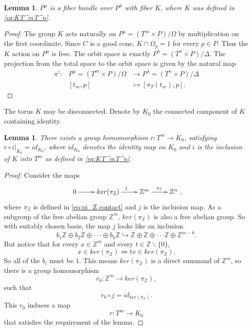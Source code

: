 \documentclass[12pt]{amsart}
\def\Z {{\mathbb{Z}}}
\newtheorem{lemma}[theorem]{Lemma}
\theoremstyle{definition}
\numberwithin{equation}{section}
\begin{document}
\begin{lemma}\label{lemma:fiberK}
$P^{\mu}$ is a fiber bundle over $P^{\lambda}$ with fiber $K$, where
$K$ was defined in \eqref{eq:KT^mT^n}.
\end{lemma}
\begin{proof} The group $K$ acts naturally on $P^{\mu}=(T^m\times
P)/\Omega$ by multiplication on the first coordinate. Since $C$ is a
good cone, $K\cap \Omega_{p}=1$ for every $p\in P$.
 Thus
the $K$ action on $P^{\mu}$ is free. The orbit space is exactly
$P^{\lambda}=(T^n\times P)/\Delta$. The projection from the total
space to the orbit space is given by the natural map
\begin{eqnarray*}\pi':& P^{\mu}=(T^m\times P)/\Omega&\rightarrow
P^{\lambda}=(T^n\times P)/\Delta\\     &[t_{m},p]&\mapsto
[\pi_{T}(t_{m}),p].
\end{eqnarray*}
\end{proof}


The torus $K$ may be disconnected. Denote by $K_{0}$ the connected
component of $K$ containing identity.

\begin{lemma}\label{lemma:torus retraction}
 There exists a group homomorphism $r: T^m\rightarrow K_{0}$,
 satisfying
$r\circ i|_{K_{0}}=id_{K_{0}}$, where $id_{K_{0}}$ denotes the
identity map on $K_{0}$ and $i$ is the inclusion of $K$ into $T^m$
as defined in \eqref{eq:KT^mT^n}.
 \end{lemma}
\begin{proof}Consider the
maps\[\xymatrix{
  0 \ar[r]^{} & ker(\pi_{\Z}) \ar[r]^{j} & \Z^m \ar[r]^{\pi_{\Z}} & \Z^n
  },\]
  where $\pi_{\Z}$ is defined in \eqref{eq:pi_Z contact} and $j$ is
  the inclusion map.
  As a subgroup of the free abelian group $\Z^m$, $ker(\pi_{\Z})$ is
  also a free abelian group. So with suitably chosen basis, the
  map $j$ looks like an inclusion \[b_{1}\Z\oplus b_{2}\Z\oplus \cdot\cdot\cdot \oplus b_{k}\Z
  \hookrightarrow \Z\oplus\Z\oplus \cdot\cdot\cdot \Z\oplus
  \Z^{m-k}.\]
  But notice that for every $x\in \Z^m$ and every $t\in \Z\backslash\{0\}$, \[x\in ker(\pi_{\Z})\Leftrightarrow tx\in
  ker(\pi_{\Z}).\]
  So all of the $b_{i}$ must be $1$. This means
  $ker(\pi_{\Z})$ is a direct summand of $\Z^m$, so there is a group homomorphism \begin{equation}
  r_{0}:\Z^m\rightarrow
  ker(\pi_{\Z}),\end{equation}
  such that
  \[r_{0}\circ j = id_{ker(\pi_{\Z})}.\]
   This
  $r_{0}$ induces a map
\begin{equation}\label{eq:torus retraction}
r: T^m\rightarrow K_{0}
\end{equation}
that satisfies the requirement of the lemma.
  \end{proof}
\end{document}
